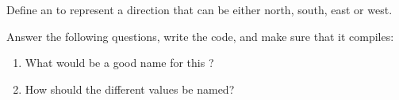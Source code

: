 Define an  to represent a direction that can be either north, south, east or west.

Answer the following questions, write the code, and make sure that it compiles:
\begin{enumerate}
  \item What would be a good name for this ?
  \item How should the different values be named?
\end{enumerate}
